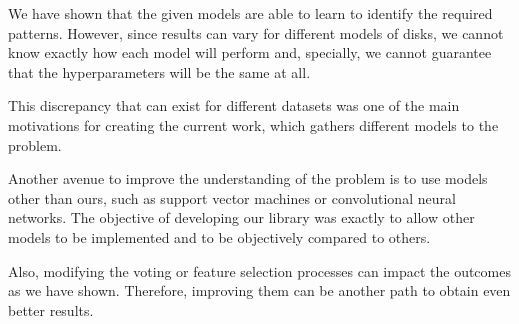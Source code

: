 We have shown that the given models are able to learn to identify the required patterns.
However, since results can vary for different models of disks, we cannot know exactly how each model will perform and, specially, we cannot guarantee that the hyperparameters will be the same at all.

This discrepancy that can exist for different datasets was one of the main motivations for creating the current work, which gathers different models to the problem.

Another avenue to improve the understanding of the problem is to use models other than ours, such as support vector machines or convolutional neural networks.
The objective of developing our library was exactly to allow other models to be implemented and to be objectively compared to others.

Also, modifying the voting or feature selection processes can impact the outcomes as we have shown.
Therefore, improving them can be another path to obtain even better results.
